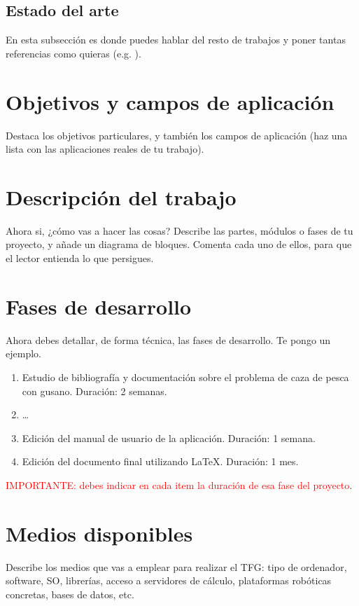 \documentclass[12pt,oneside,a4paper]{article}
\begin{document}
\subsection{Estado del arte}
En esta subsección es donde puedes hablar del resto de trabajos y poner tantas referencias como quieras (e.g. \cite{bibtex}).

\section{Objetivos y campos de aplicación}
Destaca los objetivos particulares, y también los campos de aplicación (haz una lista con las aplicaciones reales de tu trabajo).

\section{Descripción del trabajo}
Ahora si, ¿cómo vas a hacer las cosas? Describe las partes, módulos o fases de tu proyecto, y añade un diagrama de bloques. Comenta cada uno de ellos, para que el lector entienda lo que persigues.

\section{Fases de desarrollo}
Ahora debes detallar, de forma técnica, las fases de desarrollo. Te pongo un ejemplo.

\begin{enumerate}
\item Estudio de bibliografía y documentación sobre el problema de caza de pesca con gusano. Duración: 2 semanas.
\item \ldots
\item Edición del manual de usuario de la aplicación. Duración: 1 semana.
\item Edición del documento final utilizando \LaTeX. Duración: 1 mes.
\end{enumerate}

\textcolor{red}{IMPORTANTE: debes indicar en cada item la duración de esa fase del proyecto}.

\section{Medios disponibles}

Describe los medios que vas a emplear para realizar el TFG: tipo de ordenador, software, SO, librerías, acceso a servidores de cálculo, plataformas robóticas concretas, bases de datos, etc.
\end{document}
